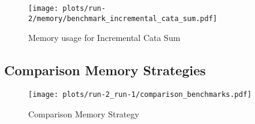 \begin{figure}[H]
    \centering
    \texttt{[image: plots/run-2/memory/benchmark\_incremental\_cata\_sum.pdf]}
    \caption{Memory usage for Incremental Cata Sum}
    \label{fig-bytes-all-inc-cata-sum}
\end{figure}

\subsection{Comparison Memory Strategies}
\begin{figure}[H]
    \centering
    \texttt{[image: plots/run-2\_run-1/comparison\_benchmarks.pdf]}
    \caption{Comparison Memory Strategy}
    \label{fig-comp-mem-strat}
\end{figure}